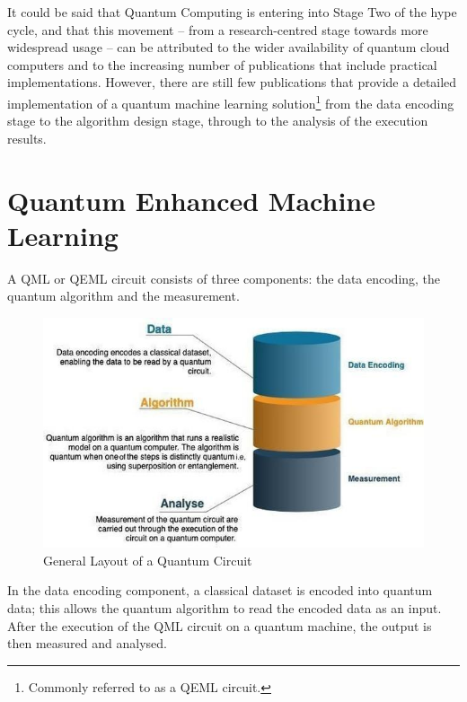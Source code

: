 It could be said that Quantum Computing is entering into Stage Two of the hype cycle, and that this movement -- from a research-centred stage towards more widespread usage -- can be attributed to the wider availability of quantum cloud computers and to the increasing number of publications that include practical implementations. However, there are still few publications that provide a detailed implementation
of a quantum machine learning solution\footnote{Commonly referred to as a QEML circuit.} from the
data encoding stage to the algorithm design stage, through to the analysis of the execution results. 


\section{Quantum Enhanced Machine Learning}
A QML or QEML circuit consists of three components: the data encoding, the quantum algorithm and the measurement. 



\begin{figure}[H]
      \centering
      \includegraphics[scale=0.6]{background/GenLayoutFix.jpeg}
      \caption{General Layout of a Quantum Circuit}
      \label{GenLay}
\end{figure}

In the data encoding component, a classical dataset is encoded into quantum data; this allows the quantum algorithm %
to read the encoded data as an input. After the execution of the QML circuit on a quantum machine, the output is then measured and analysed.

